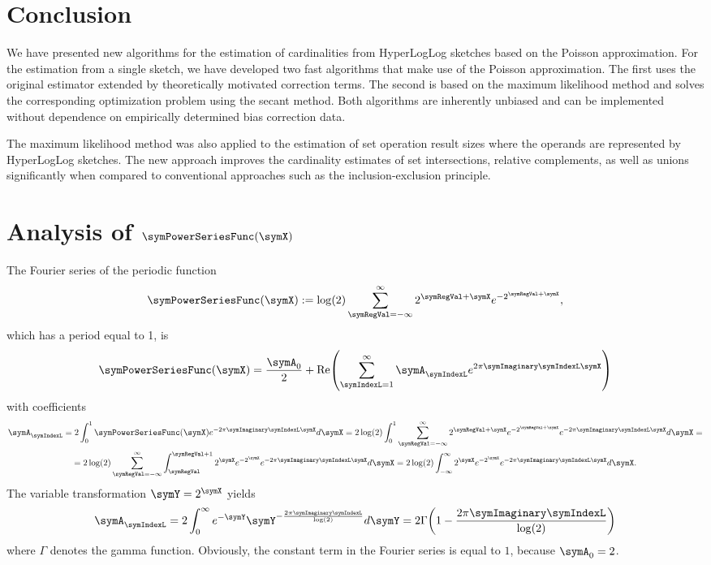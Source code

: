 \documentclass[a4paper]{scrartcl}
\renewcommand\Re{\operatorname{Re}}
\begin{document}
\section{Conclusion}
\label{sec:conclusion}
We have presented new algorithms for the estimation of cardinalities from HyperLogLog sketches based on the Poisson approximation. For the estimation from a single sketch, we have developed two fast algorithms that make use of the Poisson approximation. The first uses the original estimator extended by theoretically motivated correction terms. The second is based on the maximum likelihood method and solves the corresponding optimization problem using the secant method. Both algorithms are inherently unbiased and can be implemented without dependence on empirically determined bias correction data.

The maximum likelihood method was also applied to the estimation of set operation result sizes where the operands are represented by HyperLogLog sketches. The new approach improves the cardinality estimates of set intersections, relative complements, as well as unions significantly when compared to conventional approaches such as the inclusion-exclusion principle.
\appendix

\section{Analysis of $\symPowerSeriesFunc(\symX)$}
\label{app:analysis_xi}
The Fourier series of the periodic function
\begin{equation}
\label{equ:def_xi}
\symPowerSeriesFunc(\symX):= \log(2) \sum_{\symRegVal = -\infty}^\infty
2^{\symRegVal+\symX}
e^{-2^{\symRegVal+\symX}},
\end{equation}
which has a period equal to 1, is
\begin{equation}
\symPowerSeriesFunc(\symX) = \frac{\symA_0}{2} + \Re\!\left(\sum_{\symIndexL=1}^{\infty}
\symA_\symIndexL e^{2\pi\symImaginary\symIndexL\symX}\right)
\end{equation}
with coefficients
\begin{multline}
\symA_\symIndexL = 2\int_0^1 \symPowerSeriesFunc(\symX) e^{-2\pi\symImaginary\symIndexL\symX}d\symX
=
2\log(2)
\int_0^1
\sum_{\symRegVal = -\infty}^\infty
2^{\symRegVal+\symX}
e^{-2^{\symRegVal+\symX}}
e^{-2\pi\symImaginary\symIndexL\symX}
d\symX
=
\\
=
2\log(2)
\sum_{\symRegVal = -\infty}^\infty
\int_{\symRegVal}^{\symRegVal+1}
2^{\symX}
e^{-2^{\symX}}
e^{-2\pi\symImaginary\symIndexL\symX}
d\symX
=
2\log(2) \int_{-\infty}^{\infty} 2^\symX
e^{-2^\symX}
e^{-2\pi\symImaginary\symIndexL\symX}d\symX.
\end{multline}
The variable transformation $\symY = 2^\symX$ yields
\begin{equation}
\symA_\symIndexL
=
2\int_{0}^{\infty} e^{-\symY}
\symY^{-\frac{2\pi\symImaginary\symIndexL}{\log(2)}}d\symY
= 
2\Gamma\!\left(1-\frac{2\pi\symImaginary\symIndexL}{\log(2)}\right)
\end{equation}
where $\Gamma$ denotes the gamma function. Obviously, the constant term in the Fourier series is equal to $1$, because $\symA_0=2$. 
\end{document}
